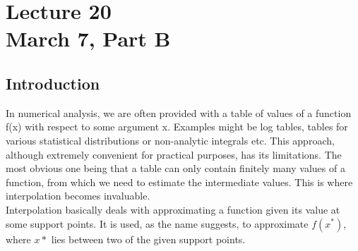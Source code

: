 \chapter*{Lecture 20 \\ March 7, Part B}
\setcounter{chapter}{4}
\setcounter{section}{0}

\section{Introduction}

In numerical analysis, we are often provided with a table of values of a function f(x) with respect to some argument x. Examples might be log tables, tables for various statistical distributions or non-analytic integrals etc. This approach, although extremely convenient for practical purposes, has its limitations. The most obvious one being that a table can only contain finitely many values of a function, from which we need to estimate the intermediate values. This is where interpolation becomes invaluable.\\

Interpolation basically deals with approximating a function given its value at some support points. It is used, as the name suggests, to approximate $f(x^*)$, where $x*$ lies between two of the given support points.

